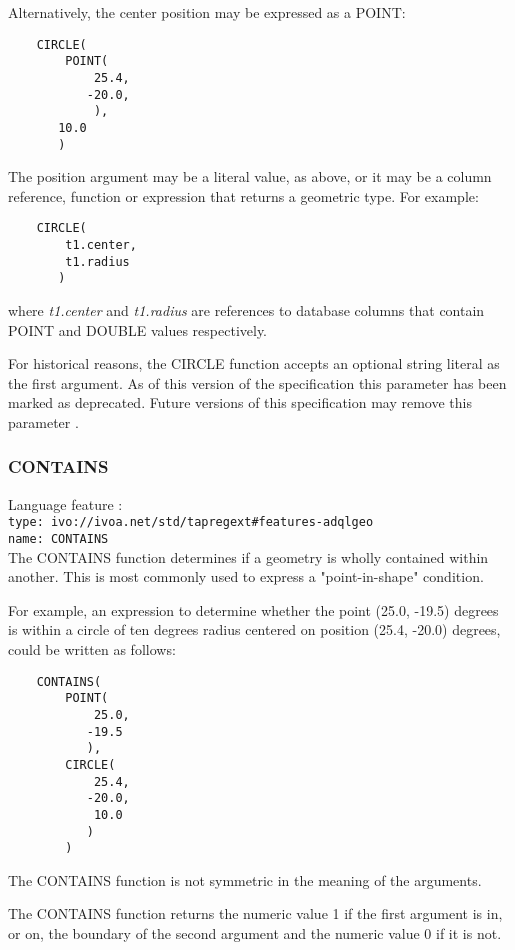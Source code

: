 \documentclass[11pt,a4paper]{ivoa}
\begin{document}
Alternatively, the center position may be expressed as a POINT:
\begin{verbatim}
    CIRCLE(
        POINT(
            25.4,
           -20.0,
            ),
       10.0
       )
\end{verbatim}

The position argument may be a literal value, as above, or it may be a
column reference, function or expression that returns a geometric type.
For example:
\begin{verbatim}
    CIRCLE(
        t1.center,
        t1.radius
       )
\end{verbatim}
where \textit{t1.center} and \textit{t1.radius} are references to
database columns that contain POINT and DOUBLE values respectively.

For historical reasons, the CIRCLE function accepts an optional string literal
as the first argument.
As of this version of the specification this parameter has been
marked as deprecated.
Future versions of this specification may remove this parameter
.

\subsubsection{CONTAINS}
\label{sec:functions.geom.contains}
{\footnotesize Language feature :}\\
{\footnotesize \verb|type: ivo://ivoa.net/std/tapregext#features-adqlgeo|}\\
{\footnotesize \verb|name: CONTAINS|}\\

The CONTAINS function determines if a geometry is wholly contained within
another. This is most commonly used to express a "point-in-shape" condition.

For example, an expression to determine whether the point (25.0, -19.5) degrees
is within a circle of ten degrees radius centered on position (25.4, -20.0) degrees,
could be written as follows:
\begin{verbatim}
    CONTAINS(
        POINT(
            25.0,
           -19.5
           ),
        CIRCLE(
            25.4,
           -20.0,
            10.0
           )
        )
\end{verbatim}

The CONTAINS function is not symmetric in the meaning of the arguments.

The CONTAINS function returns the numeric value 1 if the first argument
is in, or on, the boundary of the second argument and the numeric value 0
if it is not.
\end{document}
